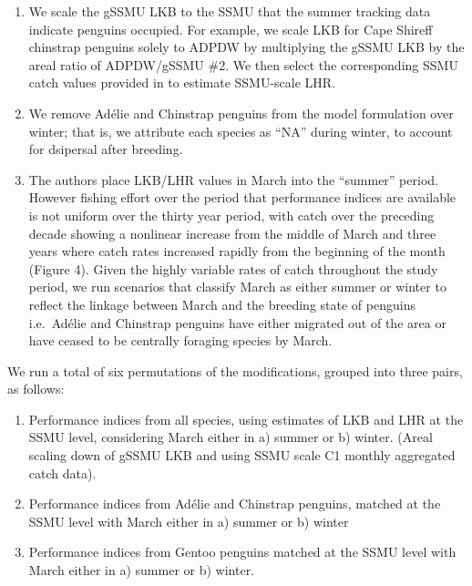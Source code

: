 \documentclass[]{elsarticle} %
\providecommand{\tightlist}{%
  \setlength{\itemsep}{0pt}\setlength{\parskip}{0pt}}
\begin{document}
\begin{enumerate}
\def\labelenumi{\arabic{enumi}.}
\tightlist
\item
  We scale the gSSMU LKB to the SSMU that the summer tracking data
  indicate penguins occupied. For example, we scale LKB for Cape Shireff
  chinstrap penguins solely to ADPDW by multiplying the gSSMU LKB by the
  areal ratio of ADPDW/gSSMU \#2. We then select the corresponding SSMU
  catch values provided in \citet{Watters2020} to estimate SSMU-scale
  LHR.
\item
  We remove Adélie and Chinstrap penguins from the model formulation
  over winter; that is, we attribute each species as ``NA'' during
  winter, to account for dsipersal after breeding.\\
\item
  The authors place LKB/LHR values in March into the ``summer'' period.
  However fishing effort over the period that performance indices are
  available is not uniform over the thirty year period, with catch over
  the preceding decade showing a nonlinear increase from the middle of
  March and three years where catch rates increased rapidly from the
  beginning of the month (Figure 4). Given the highly variable rates of
  catch throughout the study period, we run scenarios that classify
  March as either summer or winter to reflect the linkage between March
  and the breeding state of penguins i.e.~Adélie and Chinstrap penguins
  have either migrated out of the area or have ceased to be centrally
  foraging species by March.
\end{enumerate}

We run a total of six permutations of the modifications, grouped into
three pairs, as follows:

\begin{enumerate}
\def\labelenumi{\arabic{enumi}.}
\tightlist
\item
  Performance indices from all species, using estimates of LKB and LHR
  at the SSMU level, considering March either in a) summer or b) winter.
  (Areal scaling down of gSSMU LKB and using SSMU scale C1 monthly
  aggregated catch data).
\item
  Performance indices from Adélie and Chinstrap penguins, matched at the
  SSMU level with March either in a) summer or b) winter
\item
  Performance indices from Gentoo penguins matched at the SSMU level
  with March either in a) summer or b) winter.
\end{enumerate}
\end{document}
